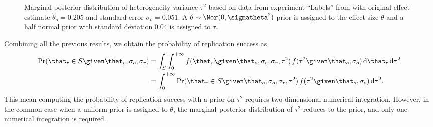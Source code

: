 \begin{subappendices}
\begin{figure}[!htb]
\begin{knitrout}
\end{knitrout}
\caption{Marginal posterior distribution of heterogeneity variance $\tau^{2}$
  based on data from experiment ``Labels'' from \citet{Protzko2020} with
  original effect estimate $\hat{\theta}_{o} = 0.205$ and
  standard error $\sigma_{o} = 0.051$. A
  $\theta \sim \Nor(0, \sigmatheta^{2})$ prior is assigned to the
  effect size $\theta$ and a half normal prior with standard deviation
  $0.04$ is assigned to $\tau$.}
\label{fig3sup:margposttau2}
\end{figure}

Combining all the previous results, we obtain the probability of replication
success as
\begin{align*}
  \Pr(\that_{r} \in S \given \that_{o}, \sigma_{o}, \sigma_{r})
  &= \int_{S}\int_{0}^{+\infty} f(\that_{r} \given \that_{o}, \sigma_{o}, \sigma_{r}, \tau^{2}) \,
    f(\tau^{2} \given \that_{o}, \sigma_{o}) \, \text{d}\that_{r} \,\text{d}\tau^{2} \\
  &= \int_{0}^{+\infty} \Pr(\that_{r} \in S \given \that_{o}, \sigma_{o}, \sigma_{r}, \tau^{2}) \,
    f(\tau^{2} \given \that_{o}, \sigma_{o}) \, \text{d}\tau^{2}. \\
\end{align*}
This mean computing the probability of replication success with a prior on
$\tau^{2}$ requires two-dimensional numerical integration. However, in the
common case when a uniform prior is assigned to $\theta$, the marginal posterior
distribution of $\tau^{2}$ reduces to the prior, and only one numerical
integration is required.


\end{subappendices}
